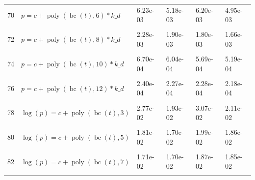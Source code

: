 \documentclass[12pt,a4paper]{article}
\DeclareMathOperator{\bc}{bc}
\DeclareMathOperator{\poly}{poly}
\begin{document}
\begin{longtable}[t]{ll>{\raggedleft\arraybackslash}p{2cm}>{\raggedleft\arraybackslash}p{2cm}>{\raggedleft\arraybackslash}p{2cm}>{\raggedleft\arraybackslash}p{2cm}}
70 & $p = c + \poly\left( \bc(t), 6 \right) * k\_d$ & 6.23e-03 & 5.18e-03 & 6.20e-03 & 4.95e-03\\
\cellcolor{gray!6}{71} & \cellcolor{gray!6}{$p = c + \poly\left( \bc(t), 7 \right) * k\_d$} & \cellcolor{gray!6}{4.52e-03} & \cellcolor{gray!6}{3.50e-03} & \cellcolor{gray!6}{3.43e-03} & \cellcolor{gray!6}{3.07e-03}\\
72 & $p = c + \poly\left( \bc(t), 8 \right) * k\_d$ & 2.28e-03 & 1.90e-03 & 1.80e-03 & 1.66e-03\\
\cellcolor{gray!6}{73} & \cellcolor{gray!6}{$p = c + \poly\left( \bc(t), 9 \right) * k\_d$} & \cellcolor{gray!6}{2.01e-03} & \cellcolor{gray!6}{1.71e-03} & \cellcolor{gray!6}{1.73e-03} & \cellcolor{gray!6}{1.57e-03}\\
74 & $p = c + \poly\left( \bc(t), 10 \right) * k\_d$ & 6.70e-04 & 6.04e-04 & 5.69e-04 & 5.19e-04\\
\cellcolor{gray!6}{75} & \cellcolor{gray!6}{$p = c + \poly\left( \bc(t), 11 \right) * k\_d$} & \cellcolor{gray!6}{5.22e-04} & \cellcolor{gray!6}{4.65e-04} & \cellcolor{gray!6}{4.32e-04} & \cellcolor{gray!6}{3.90e-04}\\
76 & $p = c + \poly\left( \bc(t), 12 \right) * k\_d$ & 2.40e-04 & 2.27e-04 & 2.28e-04 & 2.18e-04\\
\cellcolor{gray!6}{77} & \cellcolor{gray!6}{$p = c + \poly\left( \bc(t), 13 \right) * k\_d$} & \cellcolor{gray!6}{1.79e-04} & \cellcolor{gray!6}{1.73e-04} & \cellcolor{gray!6}{1.73e-04} & \cellcolor{gray!6}{1.71e-04}\\
78 & $\log(p) = c + \poly\left( \bc(t), 3 \right)$ & 2.77e-02 & 1.93e-02 & 3.07e-02 & 2.11e-02\\
\cellcolor{gray!6}{79} & \cellcolor{gray!6}{$\log(p) = c + \poly\left( \bc(t), 4 \right)$} & \cellcolor{gray!6}{2.13e-02} & \cellcolor{gray!6}{2.13e-02} & \cellcolor{gray!6}{2.34e-02} & \cellcolor{gray!6}{2.34e-02}\\
80 & $\log(p) = c + \poly\left( \bc(t), 5 \right)$ & 1.81e-02 & 1.70e-02 & 1.99e-02 & 1.86e-02\\
\cellcolor{gray!6}{81} & \cellcolor{gray!6}{$\log(p) = c + \poly\left( \bc(t), 6 \right)$} & \cellcolor{gray!6}{1.76e-02} & \cellcolor{gray!6}{1.69e-02} & \cellcolor{gray!6}{1.93e-02} & \cellcolor{gray!6}{1.84e-02}\\
82 & $\log(p) = c + \poly\left( \bc(t), 7 \right)$ & 1.71e-02 & 1.70e-02 & 1.87e-02 & 1.85e-02\\
\cellcolor{gray!6}{83} & \cellcolor{gray!6}{$\log(p) = c + \poly\left( \bc(t), 8 \right)$} & \cellcolor{gray!6}{4.36e-02} & \cellcolor{gray!6}{1.72e-02} & \cellcolor{gray!6}{4.86e-02} & \cellcolor{gray!6}{1.88e-02}\\

\end{longtable}
\end{document}
